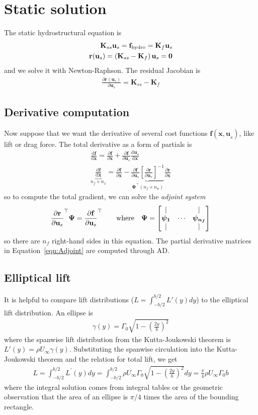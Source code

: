 \documentclass[10pt]{article}
\newcommand{\pp}[2]{\frac{\partial #1}{\partial #2}}
\newcommand{\dd}[2]{\frac{\textrm{d} #1}{\textrm{d} #2}}
\newcommand{\mbf}[1]{\mathbf{#1}}
\newcommand{\be}{\begin{eqnarray}}
\newcommand{\ee}{\end{eqnarray}}
\newcommand{\Uinf}{U_{\infty}}
\newcommand{\tn}[1]{\textnormal{#1}}
\begin{document}
\onecolumn
\clearpage
\section{Static solution}
The static hydrostructural equation is
\be
\mbf{K}_{ss} \mbf{u}_s   = \mbf{f}_{\tn{hydro}} = \mbf{K}_f \mbf{u}_s
\\
\mbf{r}(\mbf{u}_s) = \left(\mbf{K}_{ss} - \mbf{K}_f\right)\mbf{u}_s  = \mbf{0}
\ee
and we solve it with Newton-Raphson.
The residual Jacobian is
\be
\pp{\mbf{r}(\mbf{u}_s)}{\mbf{u}_s}
=
\mbf{K}_{ss} - \mbf{K}_{f}
\ee

\subsection{Derivative computation}
% 
Now suppose that we want the derivative of several cost functions $\mbf{f}(\mbf{x,u}_s)$, like lift or drag force.
The total derivative as a form of partials \cite[Sec. 6.7.2]{Martins2022} is
\be
\dd{\mbf{f}}{\mbf{x}} =
\pp{\mbf{f}}{\mbf{x}} + \pp{\mbf{f}}{\mbf{u}_s} \dd{\mbf{u}_s}{\mbf{x}}
\\
\label{eqn:Adjoint}
\boxed{
    \underbrace{
        \dd{ \mbf{f}}{\mbf{x}}
    }_{n_f \times n_x}
    = \pp{\mbf{f}}{\mbf{x}}
    -
    \underbrace{\pp{\mbf{f}}{\mbf{u}_s} \left[\pp{\mbf{r}}{\mbf{u}_s}\right]^{-1}
    }_{\boldsymbol{\Psi^\top} (n_f \times n_u)}
    \pp{\mbf{r}}{\mbf{x}}
}
\ee
so to compute the total gradient, we can solve the \emph{adjoint system}
\be
\pp{\mbf{r}}{\mbf{u}_s}^\top \boldsymbol{\Psi}
=
\pp{\mbf{f}}{\mbf{u}_s}^\top
\qquad
\tn{where}
\quad
\boldsymbol{\Psi} = \begin{bmatrix}
    |                   &        & |                       \\
    \boldsymbol{\psi_1} & \cdots & \boldsymbol{\psi_{n_f}} \\
    |                   &        & |                       \\
\end{bmatrix}
\ee
so there are $n_f$ right-hand sides in this equation.
The partial derivative matrices in Equation~\eqref{eqn:Adjoint} are computed through \ac{AD}.
\subsection{Elliptical lift}
It is helpful to compare lift distributions ($L = \int_{-b/2}^{b/2}L'(y) dy$) to the elliptical lift distribution.
An ellipse is
\be
\gamma(y)=\Gamma_0 \sqrt{1-\left(\frac{2 y}{b}\right)^2}
\ee
where the spanwise lift distribution from the Kutta-Joukowski theorem is $L'(y) = \rho \Uinf \gamma(y)$.
Substituting the spanwise circulation into the Kutta-Joukowski theorem and the relation for total lift, we get
\be
L=\int_{-b / 2}^{b / 2} L^{\prime}(y) d y=\int_{-b / 2}^{b / 2} \rho \Uinf \Gamma_0 \sqrt{1-\left(\frac{2 y}{b}\right)^2} d y=\frac{\pi}{4} \rho \Uinf \Gamma_0 b
\ee
where the integral solution comes from integral tables or the geometric observation that the area of an ellipse is $\pi/4$ times the area of the bounding rectangle.
\end{document}

